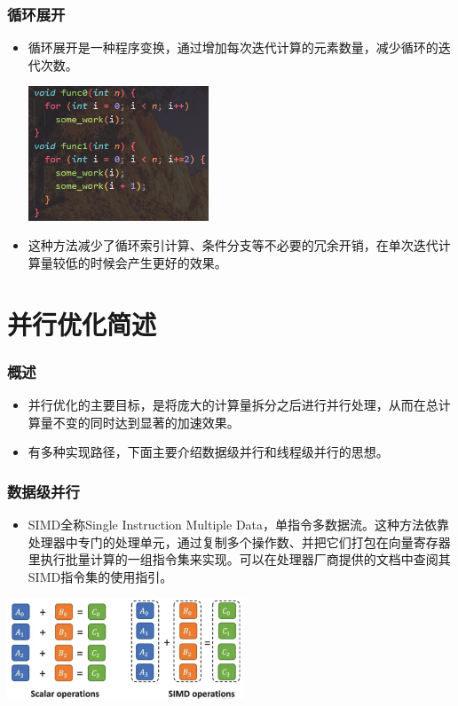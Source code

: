\documentclass{beamer}
\begin{document}
\begin{frame}
\frametitle{循环展开}

\begin{itemize}
    \item<1-> 循环展开是一种程序变换，通过增加每次迭代计算的元素数量，减少循环的迭代次数。
    
    \centering\includegraphics[height=4cm]{for.png}\pause

    \item<2-> 这种方法减少了循环索引计算、条件分支等不必要的冗余开销，在单次迭代计算量较低的时候会产生更好的效果。
\end{itemize}


\end{frame}

\section{并行优化简述}

\begin{frame}
\frametitle{概述}
\begin{itemize}
    \item<1-> 并行优化的主要目标，是将庞大的计算量拆分之后进行并行处理，从而在总计算量不变的同时达到显著的加速效果。
    \item<2-> 有多种实现路径，下面主要介绍数据级并行和线程级并行的思想。
\end{itemize}
\end{frame}

\begin{frame}
\frametitle{数据级并行}
\begin{itemize}
    \item<1-> SIMD全称Single Instruction Multiple Data，单指令多数据流。这种方法依靠处理器中专门的处理单元，通过复制多个操作数、并把它们打包在向量寄存器里执行批量计算的一组指令集来实现。可以在处理器厂商提供的文档中查阅其SIMD指令集的使用指引。
\end{itemize}
\centering\includegraphics[height=3cm]{simd.png}
\end{frame}
\end{document}
